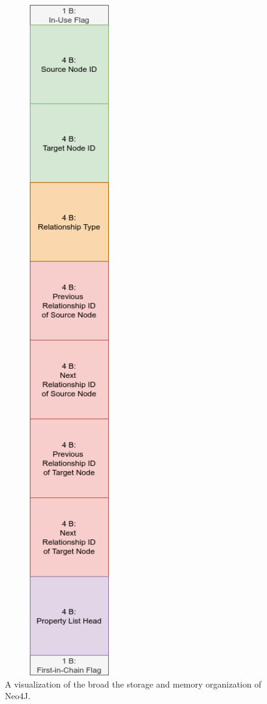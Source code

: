 \documentclass[a4paper,10pt]{article}
\begin{document}
    \begin{figure}[htp]\label{rel_record}
        \begin{center}
            \includegraphics[keepaspectratio,height=0.9\textheight,width=0.5\textwidth]{img/relationship_record.png}
        \end{center}
        \caption{A visualization of the broad the storage and memory organization of Neo4J.} %
    \end{figure}
\end{document}
